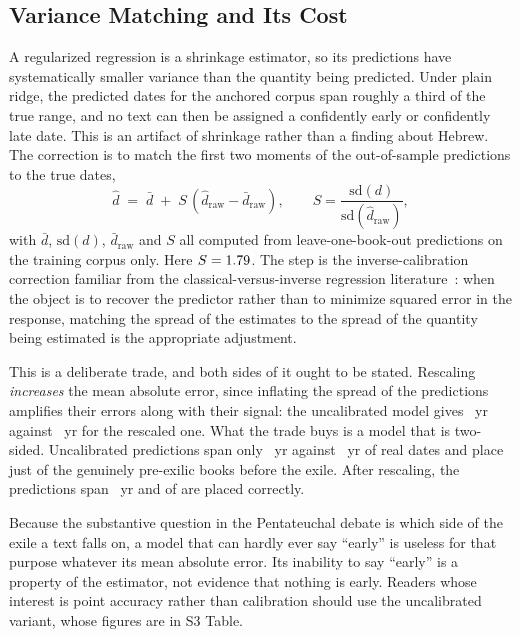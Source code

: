 \documentclass[10pt,letterpaper]{article}
\begin{document}
\subsection*{Variance Matching and Its Cost}

A regularized regression is a shrinkage estimator, so its predictions have
systematically smaller variance than the quantity being predicted.  Under plain
ridge, the predicted dates for the anchored corpus span roughly a third of the
true range, and no text can then be assigned a confidently early or confidently
late date.  This is an artifact of shrinkage rather than a finding about
Hebrew.  The correction is to match the first two moments of the out-of-sample
predictions to the true dates,
\begin{equation}
\hat{d} \;=\; \bar{d} \;+\; S\,(\hat{d}_{\text{raw}} - \bar{d}_{\text{raw}}),
\qquad
S = \frac{\mathrm{sd}(d)}{\mathrm{sd}(\hat{d}_{\text{raw}})},
\end{equation}
with $\bar d$, $\mathrm{sd}(d)$, $\bar d_{\text{raw}}$ and $S$ all computed
from leave-one-book-out predictions on the training corpus only.  Here
$S = 1.79$.  The step is the inverse-calibration correction familiar from
the classical-versus-inverse regression literature~\cite{Krutchkoff1967}: when
the object is to recover the predictor rather than to minimize squared error in
the response, matching the spread of the estimates to the spread of the
quantity being estimated is the appropriate adjustment.

This is a deliberate trade, and both sides of it ought to be stated.  Rescaling
\emph{increases} the mean absolute error, since inflating the spread of the
predictions amplifies their errors along with their signal: the uncalibrated
model gives \UNCALmae~yr against \HBmae~yr for the rescaled one.  What the
trade buys is a model that is two-sided.  Uncalibrated predictions span only
\UNCALspan~yr against \TRUEspan~yr of real dates and place just \UNCALpreok{}
of the \HBnpre{} genuinely pre-exilic books before the exile.  After rescaling,
the predictions span \VARspan~yr and \HBnpreok{} of \HBnpre{} are placed
correctly.

Because the substantive question in the Pentateuchal debate is which side of
the exile a text falls on, a model that can hardly ever say ``early'' is
useless for that purpose whatever its mean absolute error.  Its inability to
say ``early'' is a property of the estimator, not evidence that nothing is
early.  Readers whose interest is point accuracy rather than calibration should
use the uncalibrated variant, whose figures are in S3 Table.
\end{document}
